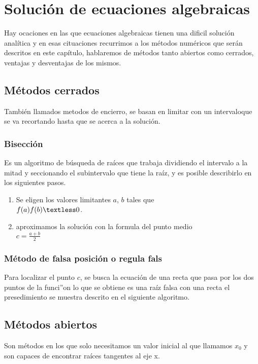 \chapter{Soluci\'on de ecuaciones algebraicas}


Hay ocaciones en las que ecuaciones algebraicas tienen una dificil soluci\'on anal\'itica y en esas cituaciones recurrimos a los m\'etodos num\'ericos que ser\'an descritos en este cap\'itulo, hablaremos de m\'etodos tanto abiertos como cerrados, ventajas y desventajas de los mismos. 

\section{M\'etodos cerrados}
Tambi\'en llamados metodos de encierro, se basan en limitar con un intervaloque se va recortando hasta que se acerca a la soluci\'on.

\subsection{Bisecci\'on}
Es un algoritmo de b\'usqueda de ra\'ices que trabaja dividiendo el intervalo a la mitad y seccionando el subintervalo que tiene la ra\'iz, y es posible describirlo en los siguientes pasos.\\
\begin{enumerate}
\item Se eligen los valores limitantes $a$,  $b$ tales que \\$f(a)f(b)\textless0$.
\item aproximamos la soluci\'on con la formula del punto medio\\$c=\frac{a+b}{2}$
\end{enumerate}
\subsection{M\'etodo de falsa posici\'on o regula fals}
Para localizar el punto $c$, se busca la ecuaci\'on de una recta que pasa por los dos puntos de la funci''on lo que se obtiene es una ra\'iz falsa con una recta el presedimiento se muestra descrito en el siguiente algoritmo.

\section{M\'etodos abiertos}
Son m\'etodos en los que solo necesitamos un valor inicial al que llamamos $x_0$ y son capaces de encontrar ra\'ices tangentes al eje x.

